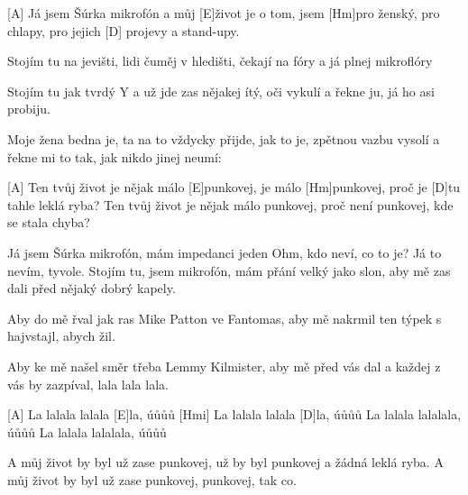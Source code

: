 
[A] Já jsem Šúrka mikrofón 
a můj [E]\null život je o tom, 
jsem [Hm]pro ženský, pro chlapy, 
pro jejich [D] projevy a stand-upy.

Stojím tu na jevišti, 
lidi čuměj v hledišti, 
čekají na fóry 
a já plnej mikroflóry

Stojím tu jak tvrdý Y
a už jde zas nějakej ítý,
oči vykulí a řekne ju,
já ho asi probiju.

Moje žena bedna je,
ta na to vždycky přijde, jak to je,
zpětnou vazbu vysolí
a řekne mi to tak, jak nikdo jinej neumí:

[A] Ten tvůj život je nějak málo [E]punkovej,
je málo [Hm]punkovej, proč je [D]tu tahle leklá ryba?
Ten tvůj život je nějak málo punkovej,
proč není punkovej, kde se stala chyba?

Já jsem Šúrka mikrofón,
mám impedanci jeden Ohm,
kdo neví, co to je?
Já to nevím, tyvole.
\slpc
Stojím tu, jsem mikrofón,
mám přání velký jako slon,
aby mě zas dali
před nějaký dobrý kapely.

Aby do mě řval jak ras
Mike Patton ve Fantomas,
aby mě nakrmil
ten týpek s hajvstajl,
abych žil.

Aby ke mě našel směr
třeba Lemmy Kilmister,
aby mě před vás dal
a každej z vás by zazpíval, lala lala lala.

[A] La lalala lalala [E]la, úůůů
[Hmi] La lalala lalala [D]la, úůůů
La lalala lalalala, úůůů
La lalala lalalala, úůůů

A můj život by byl už zase punkovej,
už by byl punkovej
a žádná leklá ryba.
A můj život by byl už zase punkovej,
punkovej, tak co.